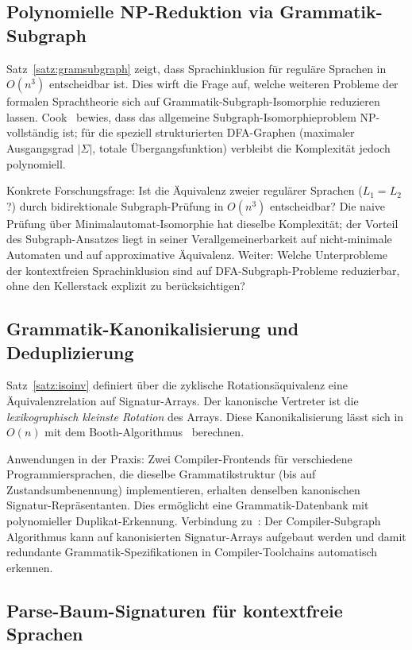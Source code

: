 ﻿\documentclass[a4paper,12pt]{article}
\theoremstyle{definition}
\begin{document}
\subsection{Polynomielle NP-Reduktion via Grammatik-Subgraph}

Satz~\ref{satz:gramsubgraph} zeigt, dass Sprachinklusion f\"ur regul\"are
Sprachen in $O(n^3)$ entscheidbar ist. Dies wirft die Frage auf, welche
weiteren Probleme der formalen Sprachtheorie sich auf Grammatik-Subgraph-Isomorphie
reduzieren lassen. Cook~\cite{cook1971} bewies, dass das allgemeine
Subgraph-Isomorphieproblem NP-vollst\"andig ist; f\"ur die speziell strukturierten
DFA-Graphen (maximaler Ausgangsgrad $|\Sigma|$, totale \"Ubergangsfunktion)
verbleibt die Komplexit\"at jedoch polynomiell.

Konkrete Forschungsfrage: Ist die \"Aquivalenz zweier regul\"arer Sprachen
($L_1 = L_2$?) durch bidirektionale Subgraph-Pr\"ufung in $O(n^3)$ entscheidbar?
Die naive Pr\"ufung \"uber Minimalautomat-Isomorphie hat dieselbe Komplexit\"at;
der Vorteil des Subgraph-Ansatzes liegt in seiner Verallgemeinerbarkeit auf
nicht-minimale Automaten und auf approximative \"Aquivalenz.
Weiter: Welche Unterprobleme der kontextfreien Sprachinklusion sind auf
DFA-Subgraph-Probleme reduzierbar, ohne den Kellerstack explizit zu ber\"ucksichtigen?

\subsection{Grammatik-Kanonikalisierung und Deduplizierung}

Satz~\ref{satz:isoinv} definiert \"uber die zyklische Rotations\"aquivalenz
eine \"Aquivalenzrelation auf Signatur-Arrays. Der kanonische Vertreter ist die
\emph{lexikographisch kleinste Rotation} des Arrays. Diese Kanonikalisierung l\"asst
sich in $O(n)$ mit dem Booth-Algorithmus~\cite{booth1980} berechnen.

Anwendungen in der Praxis: Zwei Compiler-Frontends f\"ur verschiedene
Programmiersprachen, die dieselbe Grammatikstruktur (bis auf Zustandsumbenennung)
implementieren, erhalten denselben kanonischen Signatur-Repr\"asentanten.
Dies erm\"oglicht eine Grammatik-Datenbank mit polynomieller
Duplikat-Erkennung. Verbindung zu~\cite{epp2026ccl}: Der Compiler-Subgraph Algorithmus
kann auf kanonisierten Signatur-Arrays aufgebaut werden und damit redundante
Grammatik-Spezifikationen in Compiler-Toolchains automatisch erkennen.

\subsection{Parse-Baum-Signaturen f\"ur kontextfreie Sprachen}
\end{document}
